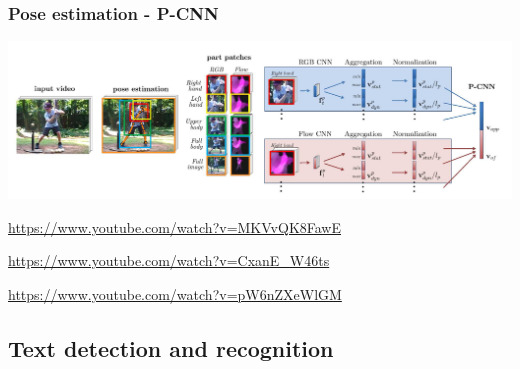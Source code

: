 \begin{frame}
	\frametitle{Pose estimation - P-CNN}


	\begin{center}
		\includegraphics[scale=0.5]{figs/P_CNN_structure}
	\end{center}

	\bigskip


	\url{https://www.youtube.com/watch?v=MKVvQK8FawE}

	\bigskip


	\url{https://www.youtube.com/watch?v=CxanE_W46ts}

	\bigskip


	\url{https://www.youtube.com/watch?v=pW6nZXeWlGM}
\end{frame}


\subsection{Text detection and recognition}

